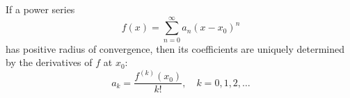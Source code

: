 If a power series
$$f(x) = \sum_{n=0}^{\infty} a_n (x - x_0)^n$$
has positive radius of convergence, then its coefficients are uniquely determined by the derivatives of $f$ at $x_0$:
$$a_k = \frac{f^{(k)}(x_0)}{k!}, \quad k = 0, 1, 2, \dots$$
